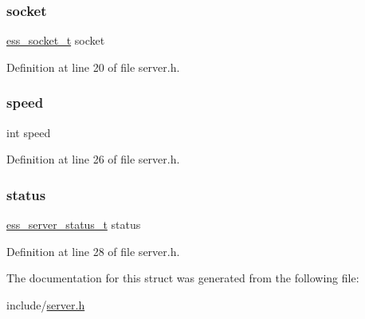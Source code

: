 \mbox{\label{structess__server_ae1095210270047614ecdcf9d808e764c}} 
\subsubsection{\texorpdfstring{socket}{socket}}
{\footnotesize\ttfamily \hyperlink{ess__socket_8h_ab7457db5cd500e7f0d74d0bc07356663}{ess\+\_\+socket\+\_\+t} socket}



Definition at line 20 of file server.\+h.

\mbox{\label{structess__server_a218b4f7c6cc2681a99c23a3b089d68b1}} 
\subsubsection{\texorpdfstring{speed}{speed}}
{\footnotesize\ttfamily int speed}



Definition at line 26 of file server.\+h.

\mbox{\label{structess__server_af34befa103928930a907b2eb5cc4739c}} 
\subsubsection{\texorpdfstring{status}{status}}
{\footnotesize\ttfamily \hyperlink{server_8h_a66019638fd44eba9d951ec93754c7b8d}{ess\+\_\+server\+\_\+status\+\_\+t} status}



Definition at line 28 of file server.\+h.



The documentation for this struct was generated from the following file\+:\begin{DoxyCompactItemize}
\item 
include/\hyperlink{server_8h}{server.\+h}\end{DoxyCompactItemize}
